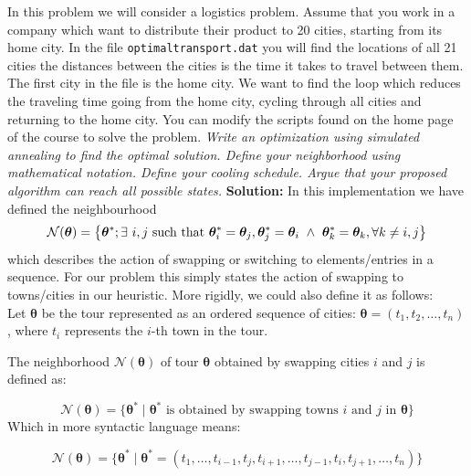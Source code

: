  In this problem we will consider a logistics problem. Assume that you work in a company which want to distribute their product to 20 cities, starting from its home city. In the file \texttt{optimaltransport.dat} you will find the locations of all 21 cities the distances between the cities is the time it takes to travel between them. The first city in the file is the home city. We want to find the loop which reduces the traveling time going from the home city, cycling through all cities and returning to the home city. You can modify the scripts found on the home page of the course to solve the problem.
\emph{Write an optimization using simulated annealing to find the optimal solution. Define your neighborhood using mathematical notation. Define your cooling schedule. Argue that your proposed algorithm can reach all possible states.} \spaze
\textbf{Solution:} \spaze
In this implementation we have defined the neighbourhood 
\begin{align*}
    \mathcal{N}(\boldsymbol{\theta}) = \left\{\boldsymbol{\theta}^{*} ; \exists \ i,j \ \text{such that} \ \boldsymbol{\theta}_{i}^{*} = \boldsymbol{\theta}_j, \boldsymbol{\theta}_{j}^{*} = \boldsymbol{\theta}_i \ \land \ \boldsymbol{\theta}_{k}^{*} = \boldsymbol{\theta}_{k}, \forall k \neq i,j  \right\}
\end{align*}
which describes the action of swapping or switching to elements/entries in a sequence. For our problem this simply states the action of swapping to towns/cities in our heuristic. More rigidly, we could also define it as follows: \vspace{2mm}\\ 
Let \( \boldsymbol{\theta} \) be the tour represented as an ordered sequence of cities: \( \boldsymbol{\theta} = (t_1, t_2, \ldots, t_n) \), where \( t_i \) represents the \( i \)-th town in the tour.

The neighborhood \( \mathcal{N}(\boldsymbol{\theta}) \) of tour \( \boldsymbol{\theta} \) obtained by swapping cities \( i \) and \( j \) is defined as:

\[ \mathcal{N}(\boldsymbol{\theta}) = \{\boldsymbol{\theta}^{*} \mid \boldsymbol{\theta}^{*} \text{ is obtained by swapping towns } i \text{ and } j \text{ in } \boldsymbol{\theta} \} \]
Which in more syntactic language means:

\[ \mathcal{N}(\boldsymbol{\theta}) = \{\boldsymbol{\theta}^{*} \mid \boldsymbol{\theta}^{*} = (t_1, \ldots, t_{i-1}, t_j, t_{i+1}, \ldots, t_{j-1}, t_i, t_{j+1}, \ldots, t_n)\} \]

